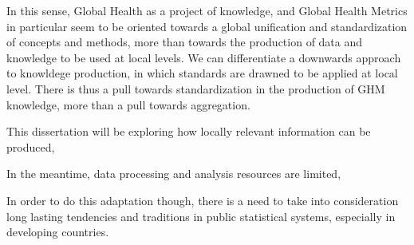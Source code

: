 In this sense, Global Health as a project of  knowledge, and Global Health Metrics in particular seem to be  oriented towards a global unification and standardization of concepts and methods, more than towards the production of data and knowledge to be used at local levels. We can differentiate a downwards approach to knowldege production, in which standards are drawned to be applied at local level. There is thus a pull towards standardization in the production of GHM knowledge, more than a pull towards aggregation.

This dissertation will be exploring how locally relevant information can be produced,

In the meantime, data processing and analysis resources are limited,






In order to do this adaptation though, there is a need to take into consideration long lasting tendencies and traditions in public statistical systems, especially in developing countries.

